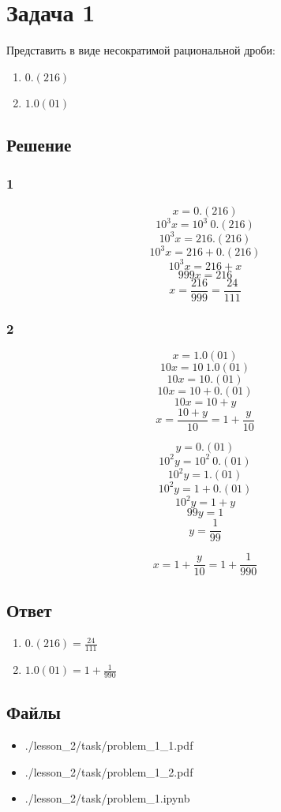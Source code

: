 \section*{Задача 1}

Представить в виде несократимой рациональной дроби:

\begin{enumerate}
  \item \( 0.(216 )\)
  \item \( 1.0(01 )\)
\end{enumerate}

\subsection*{Решение}

\subsubsection*{1}

\[ x = 0.(216) \]
\[ 10^3 x = 10^3\ 0.(216) \]
\[ 10^3 x = 216.(216) \]
\[ 10^3 x = 216 + 0.(216) \]
\[ 10^3 x = 216 + x \]
\[ 999 x = 216 \]
\[ x = \frac{216}{999} = \frac{24}{111} \]

\subsubsection*{2}

\[ x = 1.0(01) \]
\[ 10 x = 10\ 1.0(01) \]
\[ 10 x = 10.(01) \]
\[ 10 x = 10 + 0.(01) \]
\[ 10 x = 10 + y \]
\[ x = \frac{10 + y}{10} = 1 + \frac{y}{10} \]

\[ y = 0.(01) \]
\[ 10^2 y = 10^2\ 0.(01) \]
\[ 10^2 y = 1.(01) \]
\[ 10^2 y = 1 + 0.(01) \]
\[ 10^2 y = 1 + y \]
\[ 99 y = 1 \]
\[ y = \frac{1}{99} \]

\[ x = 1 + \frac{y}{10} = 1 + \frac{1}{990} \]

\subsection*{Ответ}

\begin{enumerate}
  \item \( 0.(216) = \frac{24}{111} \)
  \item \( 1.0(01) = 1 + \frac{1}{990} \)
\end{enumerate}

\subsection*{Файлы}

\begin{itemize}
  \item ./lesson\_2/task/problem\_1\_1.pdf
  \item ./lesson\_2/task/problem\_1\_2.pdf
  \item ./lesson\_2/task/problem\_1.ipynb
\end{itemize}
